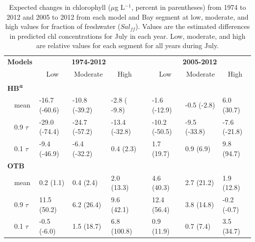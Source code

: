 \documentclass{svjour3}\usepackage[]{graphicx}\usepackage[]{color}
\newcommand{\mugl}{$\mu$g L$^{-1}$}
\begin{document}
\begin{table}[!tbp]
\caption{Expected changes in chlorophyll (\mugl, percent in parentheses) from 1974 to 2012 and 2005 to 2012 from each model and Bay segment at low, moderate, and high values for fraction of freshwater ($Sal_{ff}$).  Values are the estimated differences in predicted \ac{chl} concentrations for July in each year.  Low, moderate, and high are relative values for each segment for all years during July.\label{tab:trendest}} 
\begin{center}
\begin{tabular}{llllclll}
\hline\hline
\multicolumn{1}{l}{\bfseries {\bf Models}}&\multicolumn{3}{c}{\bfseries 1974-2012}&\multicolumn{1}{c}{\bfseries }&\multicolumn{3}{c}{\bfseries 2005-2012}\tabularnewline
\cline{2-4} \cline{6-8}
\multicolumn{1}{l}{}&\multicolumn{1}{c}{Low}&\multicolumn{1}{c}{Moderate}&\multicolumn{1}{c}{High}&\multicolumn{1}{c}{}&\multicolumn{1}{c}{Low}&\multicolumn{1}{c}{Moderate}&\multicolumn{1}{c}{High}\tabularnewline
\hline
{\bfseries HB\textsuperscript{\textit{a}}}&&&&&&&\tabularnewline
~~mean&-16.7 {\footnotesize (-60.6)}&-10.8 {\footnotesize (-39.2)}&-2.8 {\footnotesize ( -9.8)}&&-1.6 {\footnotesize (-12.9)}&-0.5 {\footnotesize (-2.8)}&6.0 {\footnotesize (30.7)}\tabularnewline
~~0.9 $\tau$&-29.0 {\footnotesize (-74.4)}&-24.7 {\footnotesize (-57.2)}&-13.4 {\footnotesize (-32.8)}&&-10.2 {\footnotesize (-50.5)}&-9.5 {\footnotesize (-33.8)}&-7.6 {\footnotesize (-21.8)}\tabularnewline
~~0.1 $\tau$&-9.4 {\footnotesize (-46.9)}&-6.4 {\footnotesize (-32.2)}&0.4 {\footnotesize (2.3)}&&1.7 {\footnotesize (19.7)}&0.9 {\footnotesize (6.9)}& 9.8 {\footnotesize (94.7)}\tabularnewline
\hline
{\bfseries OTB}&&&&&&&\tabularnewline
~~mean&0.2 {\footnotesize (1.1)}&0.4 {\footnotesize (2.4)}&2.0 {\footnotesize (13.3)}&&4.6 {\footnotesize (40.3)}&2.7 {\footnotesize (21.2)}&1.9 {\footnotesize (12.8)}\tabularnewline
~~0.9 $\tau$&11.5 {\footnotesize (50.2)}&6.2 {\footnotesize (26.4)}& 9.6 {\footnotesize (42.1)}&&12.4 {\footnotesize (56.4)}&3.8 {\footnotesize (14.8)}&-0.2 {\footnotesize (-0.7)}\tabularnewline
~~0.1 $\tau$&-0.5 {\footnotesize (-6.0)}&1.5 {\footnotesize (18.7)}&6.8 {\footnotesize (100.8)}&&0.9 {\footnotesize (11.9)}&0.7 {\footnotesize (7.4)}&3.5 {\footnotesize (34.7)}\tabularnewline

\end{tabular}
\end{center}
\end{table}
\end{document}
